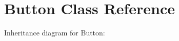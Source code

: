 \hypertarget{classButton}{}\section{Button Class Reference}
\label{classButton}


Inheritance diagram for Button\+:
